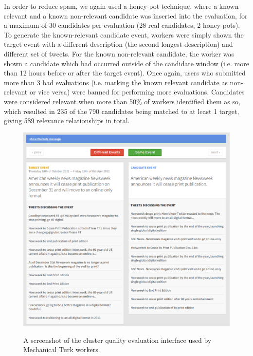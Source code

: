In order to reduce spam, we again used a honey-pot technique, where a known relevant and a known non-relevant candidate was inserted into the evaluation, for a maximum of 30 candidates per evaluation (28 real candidates, 2 honey-pots).
To generate the known-relevant candidate event, workers were simply shown the target event with a different description (the second longest description) and different set of tweets.
For the known non-relevant candidate, the worker was shown a candidate which had occurred outside of the candidate window (i.e. more than 12 hours before or after the target event).
Once again, users who submitted more than 3 bad evaluations (i.e. marking the known relevant candidate as non-relevant or vice versa) were banned for performing more evaluations.
Candidates were considered relevant when more than 50\% of workers identified them as so, which resulted in 235 of the 790 candidates being matched to at least 1 target, giving 589 relevance relationships in total.

\begin{figure}[]
	{\includegraphics[width=\textwidth]{./Chapters/Collection/images/cluster_eval}}
	\caption{A screenshot of the cluster quality evaluation interface used by Mechanical Turk workers.}
	\label{fig:clusteringscreenshot}
\end{figure}